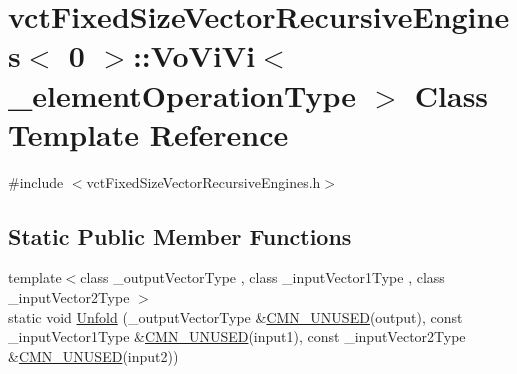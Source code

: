 \hypertarget{classvct_fixed_size_vector_recursive_engines_3_010_01_4_1_1_vo_vi_vi}{\section{vct\-Fixed\-Size\-Vector\-Recursive\-Engines$<$ 0 $>$\-:\-:Vo\-Vi\-Vi$<$ \-\_\-element\-Operation\-Type $>$ Class Template Reference}
\label{classvct_fixed_size_vector_recursive_engines_3_010_01_4_1_1_vo_vi_vi}
}


{\ttfamily \#include $<$vct\-Fixed\-Size\-Vector\-Recursive\-Engines.\-h$>$}

\subsection*{Static Public Member Functions}
\begin{DoxyCompactItemize}
\item 
{\footnotesize template$<$class \-\_\-output\-Vector\-Type , class \-\_\-input\-Vector1\-Type , class \-\_\-input\-Vector2\-Type $>$ }\\static void \hyperlink{classvct_fixed_size_vector_recursive_engines_3_010_01_4_1_1_vo_vi_vi_ab1b565a8e435a1c3f3fbfe07d1396ff4}{Unfold} (\-\_\-output\-Vector\-Type \&\hyperlink{cmn_portability_8h_a021894e2626935fa2305434b1e893ff6}{C\-M\-N\-\_\-\-U\-N\-U\-S\-E\-D}(output), const \-\_\-input\-Vector1\-Type \&\hyperlink{cmn_portability_8h_a021894e2626935fa2305434b1e893ff6}{C\-M\-N\-\_\-\-U\-N\-U\-S\-E\-D}(input1), const \-\_\-input\-Vector2\-Type \&\hyperlink{cmn_portability_8h_a021894e2626935fa2305434b1e893ff6}{C\-M\-N\-\_\-\-U\-N\-U\-S\-E\-D}(input2))
\end{DoxyCompactItemize}


